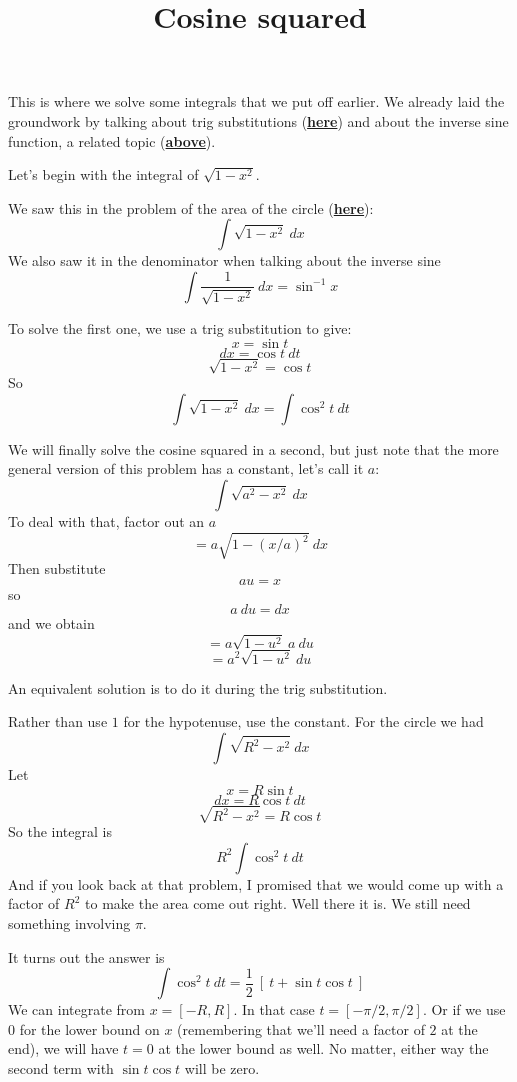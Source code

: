 \documentclass[11pt, oneside]{article}
\title{Cosine squared}
\date{}
\begin{document}
\maketitle
\Large

\label{sec:Cosine_squared}

This is where we solve some integrals that we put off earlier.  We already laid the groundwork by talking about trig substitutions (\hyperref[sec:Techniques_of_integration]{\textbf{here}}) and about the inverse sine function, a related topic (\hyperref[sec:Inverse_trig]{\textbf{above}}).

Let's begin with the integral of $\sqrt{1 - x^2}$.  

We saw this in the problem of the area of the circle (\hyperref[sec:Easy_pieces]{\textbf{here}}):
\[ \int \sqrt{1 - x^2} \ dx \]
We also saw it in the denominator when talking about the inverse sine
\[ \int \frac{1}{\sqrt{1 - x^2}} \ dx = \sin^{-1} x \]

To solve the first one, we use a trig substitution to give:
\[ x = \sin t \]
\[ dx = \cos t \ dt \]
\[ \sqrt{1-x^2} = \cos t \]
So
\[ \int \sqrt{1 - x^2} \ dx = \int \cos^2 t \ dt \]

We will finally solve the cosine squared in a second, but just note that the more general version of this problem has a constant, let's call it $a$:
\[ \int \sqrt{a^2 - x^2} \ dx \]
To deal with that, factor out an $a$
\[ = a \sqrt{1 - (x/a)^2} \ dx \]
Then substitute 
\[ au = x \]
 so 
 \[ a \ du = dx \]
 and we obtain
\[ = a \sqrt{1 - u^2} \ a \ du \]
\[ = a^2 \sqrt{1 - u^2}  \ du  \]

An equivalent solution is to do it during the trig substitution.

Rather than use $1$ for the hypotenuse, use the constant.  For the circle we had
\[ \int \sqrt{R^2 - x^2} \ dx \]
Let 
\[ x = R \sin t \]
\[ dx = R \cos t \ dt \]
\[ \sqrt{R^2 - x^2} = R \cos t \]
So the integral is
\[ R^2 \int \cos^2 t \ dt \]
And if you look back at that problem, I promised that we would come up with a factor of $R^2$ to make the area come out right.  Well there it is.  We still need something involving $\pi$.

It turns out the answer is 
\[ \int \cos^2 t \ dt = \frac{1}{2} \ [ \ t + \sin t \cos t \ ]  \]
We can integrate from $x = [-R,R]$.  In that case $t = [-\pi/2, \pi/2]$.  Or if we  use $0$ for the lower bound on $x$ (remembering that we'll need a factor of $2$ at the end), we will have $t = 0$ at the lower bound as well.  No matter, either way the second term with $\sin t \cos t$ will be zero.  
\end{document}
